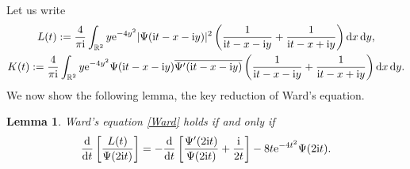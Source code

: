 \documentclass[pdftex]{sigma}
\numberwithin{equation}{section}
\newtheorem{Lemma}[Theorem]{Lemma}
\newcommand{\R}{{\mathbb R}}
\newcommand{\1}{\chi}
\begin{document}
Let us write
\begin{gather*}
	L(t) :=\frac{4}{\pi {\rm i}} \int_{\R^2} y {\rm e}^{ -4y^2 } |\Psi({\rm i}t-x-{\rm i}y)|^2 \left( \frac{1}{{\rm i}t-x-{\rm i}y}+\frac{1}{{\rm i}t-x+{\rm i}y} \right) {\rm d}x\,{\rm d}y,
	\\
	K(t) :=\frac{4}{\pi {\rm i}} \int_{\R^2} y {\rm e}^{ -4y^2 } \Psi({\rm i}t-x-{\rm i}y) \overline{ \Psi'({\rm i}t-x-{\rm i}y) } \left( \frac{1}{{\rm i}t-x-{\rm i}y}+\frac{1}{{\rm i}t-x+{\rm i}y} \right) {\rm d}x\,{\rm d}y.
\end{gather*}
We now show the following lemma, the key reduction of Ward's equation.

\begin{Lemma}\label{Lem_Ward var2}
	Ward's equation \eqref{Ward} holds if and only if
	\begin{gather*} %
		\frac{{\rm d}}{{\rm d}t} \left[ \frac{L(t)}{\Psi(2{\rm i}t)} \right] = -\frac{{\rm d}}{{\rm d}t}\left[ \frac{\Psi'(2{\rm i}t)}{\Psi(2{\rm i}t)}+\frac{{\rm i}}{2t} \right]-8t {\rm e}^{-4t^2} \Psi(2{\rm i}t).
	\end{gather*}
\end{Lemma}
\end{document}
